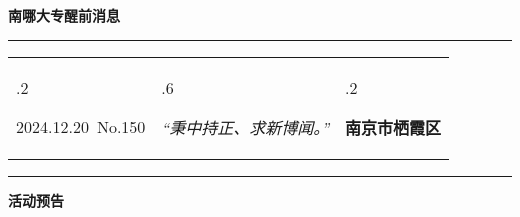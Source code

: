 \documentclass[letterpaper, 12pt]{article}
\begin{document}
\begin{center}
    \Huge\textbf{南哪大专醒前消息}
\end{center}
\vspace{4mm}
\hrule
\renewcommand\tabularxcolumn[1]{m{#1}}
\begin{tabularx}{\textwidth}{>{\hsize.2\hsize}X>{\hsize.6\hsize}X>{\hsize.2\hsize}X}
    \begin{flushleft}
        2024.12.20\, No.150
    \end{flushleft}
    &
    \begin{center}
        \textit{“秉中持正、求新博闻。”}
    \end{center}
    &
    \begin{flushright}
        \textbf{南京市栖霞区}
    \end{flushright}
\end{tabularx}
\vspace{-3.5mm}
\hrule
\vspace{4mm}
\centerline{\huge\textbf{活动预告}}
\end{document}
